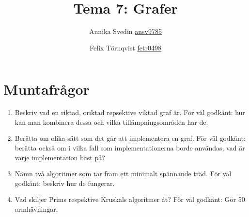 \documentclass[a5paper,10pt,oneside]{article}
\title{Tema 7: Grafer}
\author{Annika Svedin \url{ansv9785} \and Felix Törnqvist \url{fetr0498}}
\begin{document}
\maketitle

\section*{Muntafrågor}

\begin{enumerate}
	\item Beskriv vad en riktad, oriktad repsektive viktad graf är. För väl godkänt: hur kan man kombinera dessa och vilka tillämpningsområden har de.
	
	\item Berätta om olika sätt som det går att implementera en graf. För väl godkänt: berätta också om i vilka fall som implementationerna borde användas, vad är varje implementation bäst på?
	
	
	\item Nämn två algoritmer som tar fram ett minimalt spännande träd. För väl godkänt: beskriv hur de fungerar.
	
	\item Vad skiljer Prims respektive Kruskals algoritmer åt? För väl godkänt: Gör 50 armhävningar.
\end{enumerate}
\end{document}
